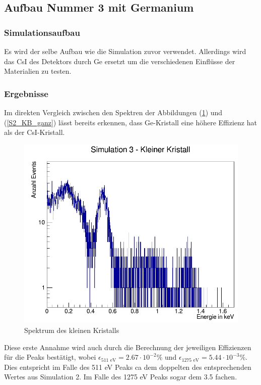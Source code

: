 \documentclass[a4paper,11pt,twoside]{article}
\begin{document}
	\subsection{Aufbau Nummer 3 mit Germanium}
		\subsubsection{Simulationsaufbau}
			Es wird der selbe Aufbau wie die Simulation zuvor verwendet. Allerdings wird das CsI des Detektors durch Ge ersetzt um die verschiedenen Einflüsse der Materialien zu testen.
			
			
		\subsubsection{Ergebnisse}
			Im direkten Vergleich zwischen den Spektren der Abbildungen (\ref{S3_ganz}) und (\ref{S2_KB_ganz}) lässt bereits erkennen, dass Ge-Kristall eine höhere Effizienz hat als der CsI-Kristall.
			
			\begin{figure}[H]
				\begin{center}
				\includegraphics[width=0.7\linewidth]{Simulation3(KB)_ganz}
				\caption{Spektrum des kleinen Kristalls}
				\label{S3_ganz}
				\end{center}
			\end{figure}
			
			Diese erste Annahme wird auch durch die Berechnung der jeweiligen Effizienzen für die Peaks bestätigt, wobei $\epsilon_\textrm{511 eV}=2.67\cdot 10^{-2}\%$ und $\epsilon_\textrm{1275 eV}=5.44\cdot 10^{-3}\%$. Dies entspricht im Falle des 511 eV Peaks ca dem doppelten des entsprechenden Wertes aus Simulation 2. Im Falle des 1275 eV Peaks sogar dem 3.5 fachen. 
			
\end{document}
